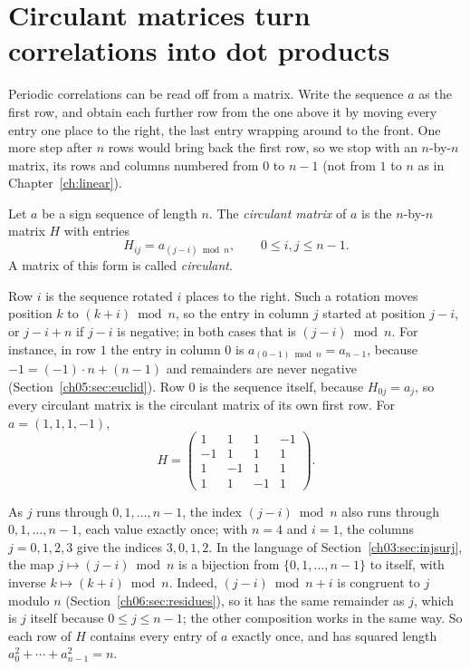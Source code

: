 \section{Circulant matrices turn correlations into dot products}\label{ch14:sec:circulant}
Periodic correlations can be read off from a matrix. Write the sequence $a$ as the first row, and obtain each further row from the one above it by moving every entry one place to the right, the last entry wrapping around to the front. One more step after $n$ rows would bring back the first row, so we stop with an $n$-by-$n$ matrix, its rows and columns numbered from $0$ to $n-1$ (not from $1$ to $n$ as in Chapter~\ref{ch:linear}).

\par\noindent\begin{minipage}{\linewidth}
\begin{definition}\label{ch14:def:circulant}
Let $a$ be a sign sequence of length $n$. The \emph{circulant matrix} of $a$ is the $n$-by-$n$ matrix $H$ with entries
\[
H_{ij}=a_{(j-i)\bmod n},\qquad0\le i,j\le n-1.
\]
A matrix of this form is called \emph{circulant}.
\end{definition}
\end{minipage}\par

Row $i$ is the sequence rotated $i$ places to the right. Such a rotation moves position $k$ to $(k+i)\bmod n$, so the entry in column $j$ started at position $j-i$, or $j-i+n$ if $j-i$ is negative; in both cases that is $(j-i)\bmod n$. For instance, in row $1$ the entry in column $0$ is $a_{(0-1)\bmod n}=a_{n-1}$, because $-1=(-1)\cdot n+(n-1)$ and remainders are never negative (Section~\ref{ch05:sec:euclid}). Row $0$ is the sequence itself, because $H_{0j}=a_j$, so every circulant matrix is the circulant matrix of its own first row. For $a=(1,1,1,-1)$,
\[
H=\begin{pmatrix}
1&1&1&-1\\
-1&1&1&1\\
1&-1&1&1\\
1&1&-1&1
\end{pmatrix}.
\]

As $j$ runs through $0,1,\ldots,n-1$, the index $(j-i)\bmod n$ also runs through $0,1,\ldots,n-1$, each value exactly once; with $n=4$ and $i=1$, the columns $j=0,1,2,3$ give the indices $3,0,1,2$. In the language of Section~\ref{ch03:sec:injsurj}, the map $j\mapsto(j-i)\bmod n$ is a bijection from $\{0,1,\ldots,n-1\}$ to itself, with inverse $k\mapsto(k+i)\bmod n$. Indeed, $(j-i)\bmod n+i$ is congruent to $j$ modulo $n$ (Section~\ref{ch06:sec:residues}), so it has the same remainder as $j$, which is $j$ itself because $0\le j\le n-1$; the other composition works in the same way. So each row of $H$ contains every entry of $a$ exactly once, and has squared length $a_0^2+\cdots+a_{n-1}^2=n$.

